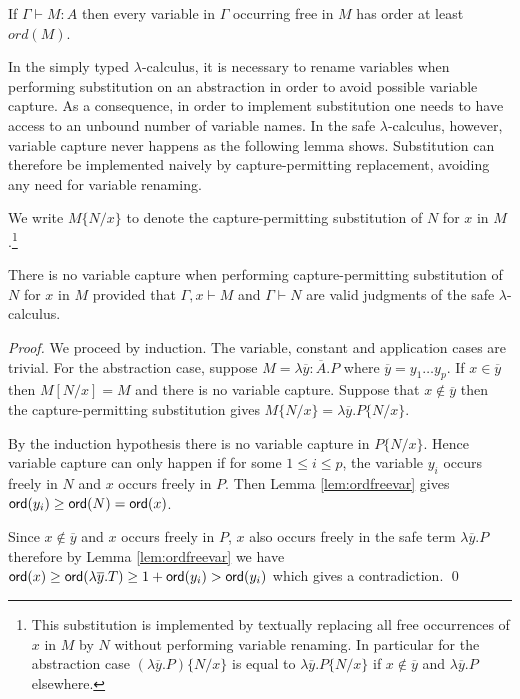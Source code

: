 \documentclass{llncs}
\newcommand\subst[2]{\left[ #1/#2 \right]}
\newcommand\captsubst[2]{\{#1/#2 \}}
\newcommand\ord[1]{{\sf ord}(#1)}
\begin{document}
\begin{lemma}
\label{lem:ordfreevar}
If $\Gamma \vdash M : A$ then every variable in $\Gamma$ occurring free in $M$ has order at least $ord(M)$.
\end{lemma}




In the simply typed $\lambda$-calculus, it is necessary to rename
variables when performing substitution on an abstraction in order to
avoid possible variable capture. As a consequence, in order to
implement substitution one needs to have access to an unbound number
of variable names.
In the safe $\lambda$-calculus, however, variable capture never happens as the following lemma shows. Substitution can therefore be implemented naively by capture-permitting replacement, avoiding any need for variable renaming.


We write $M\captsubst{N}{x}$ to denote the capture-permitting substitution of $N$ for $x$ in $M$.\footnote{This substitution is implemented
by textually replacing all free occurrences of $x$ in $M$ by $N$ without performing variable renaming.
In particular for the abstraction case
$(\lambda \overline{y} . P)\captsubst{N}{x}$ is
equal to $\lambda \overline{y} . P\captsubst{N}{x}$ if $x\not\in \overline{y}$ and $\lambda \overline{y} . P$ elsewhere.}

\begin{lemma}
\label{lem:homog_nocapture} There is
no variable capture when performing capture-permitting
substitution of $N$ for $x$ in $M$
provided that $\Gamma, x \vdash M$ and $\Gamma \vdash  N$ are valid judgments of the safe $\lambda$-calculus.
\end{lemma}

\begin{proof}
We proceed by induction. The variable, constant and
application cases are trivial. For the abstraction case, suppose $M
= \lambda \overline{y} : \overline{A}. P$ where $\overline{y} = y_1
\ldots y_p$. If $x \in \overline{y}$ then $M \subst{N}{x} = M$ and there is no variable capture.
Suppose that $x \not\in \overline{y}$ then the capture-permitting substitution gives
$M \captsubst{N}{x} = \lambda \overline{y} . P \captsubst{N}{x}$.

By the induction hypothesis there is no variable capture in $P \captsubst{N}{x}$.
Hence variable capture can only happen if for some $1 \leq i \leq p$, the variable $y_i$
occurs freely in $N$ and $x$ occurs freely in $P$. Then Lemma \ref{lem:ordfreevar} gives
$ \ord{y_i} \geq \ord{N} = \ord{x}$.

Since $x \not \in \overline{y}$ and $x$ occurs freely in $P$, $x$ also occurs freely in the safe term
$\lambda \overline{y}. P$ therefore by Lemma \ref{lem:ordfreevar} we have
$ \ord{x} \geq \ord{\lambda \overline{y} . T} \geq 1+ \ord{y_i} > \ord{y_i}$
which gives a contradiction. \qed
\end{proof}
\end{document}
